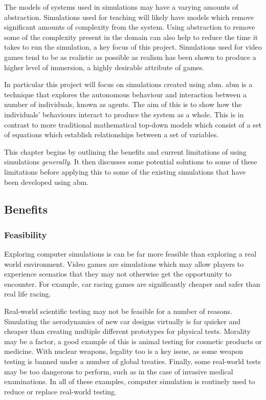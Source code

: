 \documentclass{UoYCSproject}
\begin{document}
The models of systems used in simulations may have a varying amounts of abstraction.
Simulations used for teaching will likely have models which remove significant amounts of complexity from the system.
Using abstraction to remove some of the complexity present in the domain can also help to reduce the time it takes to run the simulation, a key focus of this project.
Simulations used for video games tend to be as realistic as possible as realism has been shown to produce a higher level of immersion\cite{realism_immersion}, a highly desirable attribute of games.

In particular this project will focus on simulations created using \acrfull{abm}.
\gls{abm} is a technique that explores the autonomous behaviour and interaction between a number of individuals, known as agents.
The aim of this is to show how the individuals' behaviours interact to produce the system as a whole.
This is in contrast to more traditional mathematical top-down models which consist of a set of equations which establish relationships between a set of variables.

This chapter begins by outlining the benefits and current limitations of using simulations \textit{generally}.
It then discusses some potential solutions to some of these limitations before applying this to some of the existing simulations that have been developed using \gls{abm}.

\subsection{Benefits}
\subsubsection{Feasibility}
Exploring computer simulations is can be far more feasible than exploring a real world environment.
Video games are simulations which may allow players to experience scenarios that they may not otherwise get the opportunity to encounter.
For example, car racing games are significantly cheaper and safer than real life racing.

Real-world scientific testing may not be feasible for a number of reasons.
Simulating the aerodynamics of new car designs virtually is far quicker and cheaper than creating multiple different prototypes for physical tests.
Morality may be a factor, a good example of this is animal testing for cosmetic products or medicine.
With nuclear weapons, legality too is a key issue, as some weapon testing is banned under a number of global treaties\cite{partial_nuclear_test_ban_treaty, threshold_test_ban_treaty}.
Finally, some real-world tests may be too dangerous to perform, such as in the case of invasive medical examinations.
In all of these examples, computer simulation is routinely used to reduce or replace real-world testing.
\end{document}
